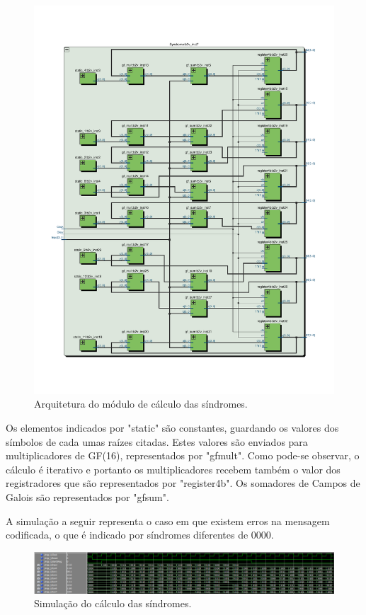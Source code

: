 	\begin{figure}[!htb]
		\caption{\label{fig_sindrome_arq}Arquitetura do módulo de cálculo das síndromes.}
		\centering
		\includegraphics[width=1\textwidth]{RS/SindromeRTL.pdf}
		\legend{}
	\end{figure}

	Os elementos indicados por "static" são constantes, guardando os valores dos símbolos de cada umas raízes citadas. Estes valores são enviados para multiplicadores de GF(16), representados por "gfmult". Como pode-se observar, o cálculo é iterativo e portanto os multiplicadores recebem também o valor dos registradores que são representados por "register4b". Os somadores de Campos de Galois são representados por "gfsum".
	
	A simulação a seguir representa o caso em que existem erros na mensagem codificada, o que é indicado por síndromes diferentes de 0000.
	
	\begin{figure}[!htb]
		\caption{\label{fig_sindrome_sim}Simulação do cálculo das síndromes.}
		\centering
		\includegraphics[width=1\textwidth]{RS/Sim_sindrome.PNG}
		\legend{}
	\end{figure}

